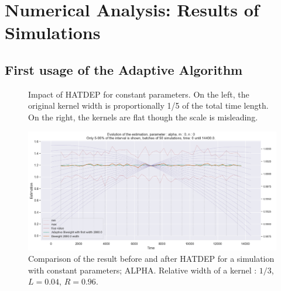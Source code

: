 \chapter{Numerical Analysis: Results of Simulations}


\section{First usage of the Adaptive Algorithm}


\begin{figure}
\centering
{} 
\caption{Impact of HATDEP for constant parameters. On the left, the original kernel width is proportionally 1/5 of the total time length. On the right, the kernels are flat though the scale is misleading.}
\label{fig:compar_kernels_0}
\end{figure}


\begin{figure}
\centering
\includegraphics[width = 0.90 \textwidth]{../imag/chap3/0/A.png}
\caption{Comparison of the result before and after HATDEP for a simulation with constant parameters; ALPHA. Relative width of a kernel : $1/3$, $L = 0.04$, $R = 0.96$.}
\label{fig:first_estimate_0_alpha}
\end{figure}


